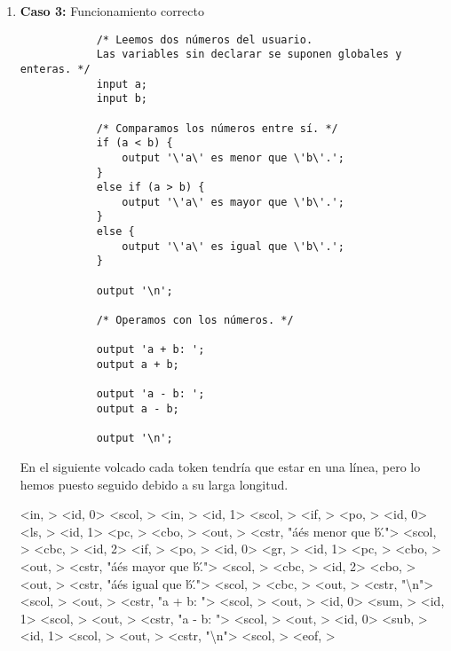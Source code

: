 \documentclass{article}
\begin{document}
\begin{enumerate}
    \newpage
    
    \item \textbf{Caso 3:} Funcionamiento correcto

    \begin{tcolorbox}[title={Código fuente}, colback=white]
        \begin{lstlisting}
            /* Leemos dos números del usuario. 
            Las variables sin declarar se suponen globales y enteras. */
            input a;
            input b;
            
            /* Comparamos los números entre sí. */
            if (a < b) {
                output '\'a\' es menor que \'b\'.';
            }
            else if (a > b) {
                output '\'a\' es mayor que \'b\'.';
            }
            else {
                output '\'a\' es igual que \'b\'.';
            }
            
            output '\n';
            
            /* Operamos con los números. */
            
            output 'a + b: ';
            output a + b;
            
            output 'a - b: ';
            output a - b;
            
            output '\n';
        \end{lstlisting}        
    \end{tcolorbox}

    En el siguiente volcado cada token tendría que estar en una línea, pero lo hemos puesto seguido debido a su larga longitud. 
    
    \begin{tcolorbox}[title={Volcado del fichero de tokens}, colback=white]
        <in, >
        <id, 0>
        <scol, >
        <in, >
        <id, 1>
        <scol, >
        <if, >
        <po, >
        <id, 0>
        <ls, >
        <id, 1>
        <pc, >
        <cbo, >
        <out, >
        <cstr, "\'a\' es menor que \'b\'.">
        <scol, >
        <cbc, >
        <id, 2>
        <if, >
        <po, >
        <id, 0>
        <gr, >
        <id, 1>
        <pc, >
        <cbo, >
        <out, >
        <cstr, "\'a\' es mayor que \'b\'.">
        <scol, >
        <cbc, >
        <id, 2>
        <cbo, >
        <out, >
        <cstr, "\'a\' es igual que \'b\'.">
        <scol, >
        <cbc, >
        <out, >
        <cstr, "\textbackslash n">
        <scol, >
        <out, >
        <cstr, "a + b: ">
        <scol, >
        <out, >
        <id, 0>
        <sum, >
        <id, 1>
        <scol, >
        <out, >
        <cstr, "a - b: ">
        <scol, >
        <out, >
        <id, 0>
        <sub, >
        <id, 1>
        <scol, >
        <out, >
        <cstr, "\textbackslash n">
        <scol, >
        <eof, >
    \end{tcolorbox}


\end{enumerate}
\end{document}
